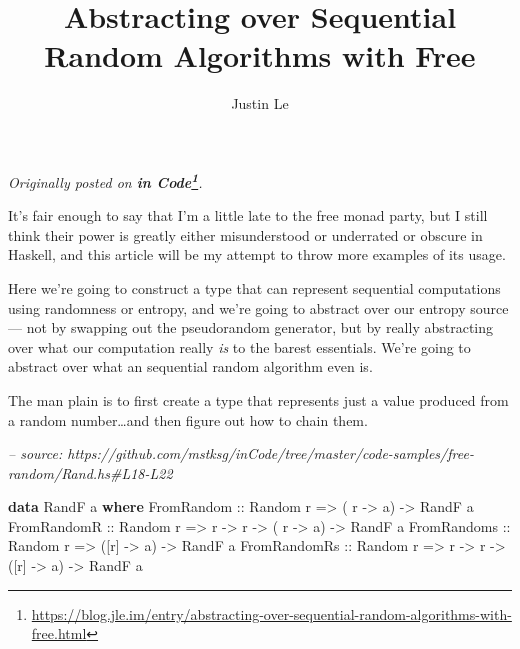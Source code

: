 \documentclass[]{article}
\title{Abstracting over Sequential Random Algorithms with Free}
\author{Justin Le}
\newenvironment{Shaded}{}{}
\newcommand{\CommentTok}[1]{\textcolor[rgb]{0.38,0.63,0.69}{\textit{#1}}}
\newcommand{\DataTypeTok}[1]{\textcolor[rgb]{0.56,0.13,0.00}{#1}}
\newcommand{\KeywordTok}[1]{\textcolor[rgb]{0.00,0.44,0.13}{\textbf{#1}}}
\newcommand{\NormalTok}[1]{#1}
\newcommand{\OtherTok}[1]{\textcolor[rgb]{0.00,0.44,0.13}{#1}}
\renewcommand{\href}[2]{#2\footnote{\url{#1}}}
\begin{document}
\maketitle

\emph{Originally posted on
\textbf{\href{https://blog.jle.im/entry/abstracting-over-sequential-random-algorithms-with-free.html}{in
Code}}.}

It's fair enough to say that I'm a little late to the free monad party, but I
still think their power is greatly either misunderstood or underrated or obscure
in Haskell, and this article will be my attempt to throw more examples of its
usage.

Here we're going to construct a type that can represent sequential computations
using randomness or entropy, and we're going to abstract over our entropy source
--- not by swapping out the pseudorandom generator, but by really abstracting
over what our computation really \emph{is} to the barest essentials. We're going
to abstract over what an sequential random algorithm even is.

The man plain is to first create a type that represents just a value produced
from a random number\ldots{}and then figure out how to chain them.

\begin{Shaded}
\begin{Highlighting}[]
\CommentTok{-- source: https://github.com/mstksg/inCode/tree/master/code-samples/free-random/Rand.hs#L18-L22}

\KeywordTok{data} \DataTypeTok{RandF}\NormalTok{ a }\KeywordTok{where}
    \DataTypeTok{FromRandom}\OtherTok{   ::} \DataTypeTok{Random}\NormalTok{ r }\OtherTok{=>}\NormalTok{           ( r  }\OtherTok{->}\NormalTok{ a) }\OtherTok{->} \DataTypeTok{RandF}\NormalTok{ a}
    \DataTypeTok{FromRandomR}\OtherTok{  ::} \DataTypeTok{Random}\NormalTok{ r }\OtherTok{=>}\NormalTok{ r }\OtherTok{->}\NormalTok{ r }\OtherTok{->}\NormalTok{ ( r  }\OtherTok{->}\NormalTok{ a) }\OtherTok{->} \DataTypeTok{RandF}\NormalTok{ a}
    \DataTypeTok{FromRandoms}\OtherTok{  ::} \DataTypeTok{Random}\NormalTok{ r }\OtherTok{=>}\NormalTok{           ([r] }\OtherTok{->}\NormalTok{ a) }\OtherTok{->} \DataTypeTok{RandF}\NormalTok{ a}
    \DataTypeTok{FromRandomRs}\OtherTok{ ::} \DataTypeTok{Random}\NormalTok{ r }\OtherTok{=>}\NormalTok{ r }\OtherTok{->}\NormalTok{ r }\OtherTok{->}\NormalTok{ ([r] }\OtherTok{->}\NormalTok{ a) }\OtherTok{->} \DataTypeTok{RandF}\NormalTok{ a}
\end{Highlighting}
\end{Shaded}
\end{document}
